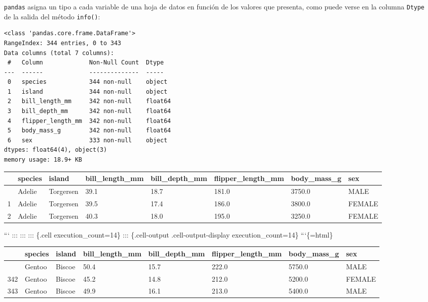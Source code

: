 \documentclass[
  a4paper,
  noprof,
  12pt,
  notoc,
  nosols,
  nobib]{mnye}
\theoremstyle{definition}
\theoremstyle{remark}
\begin{document}
\texttt{pandas} asigna un tipo a cada variable de una hoja de datos en
función de los valores que presenta, como puede verse en la columna
\texttt{Dtype} de la salida del método \texttt{info()}:

\begin{verbatim}
<class 'pandas.core.frame.DataFrame'>
RangeIndex: 344 entries, 0 to 343
Data columns (total 7 columns):
 #   Column             Non-Null Count  Dtype  
---  ------             --------------  -----  
 0   species            344 non-null    object 
 1   island             344 non-null    object 
 2   bill_length_mm     342 non-null    float64
 3   bill_depth_mm      342 non-null    float64
 4   flipper_length_mm  342 non-null    float64
 5   body_mass_g        342 non-null    float64
 6   sex                333 non-null    object 
dtypes: float64(4), object(3)
memory usage: 18.9+ KB
\end{verbatim}

\begin{longtable}[]{@{}llllllll@{}}
\toprule\noalign{}
& species & island & bill\_length\_mm & bill\_depth\_mm &
flipper\_length\_mm & body\_mass\_g & sex \\
\midrule\noalign{}
\endhead
\bottomrule\noalign{}
\endlastfoot
0 & Adelie & Torgersen & 39.1 & 18.7 & 181.0 & 3750.0 & MALE \\
1 & Adelie & Torgersen & 39.5 & 17.4 & 186.0 & 3800.0 & FEMALE \\
2 & Adelie & Torgersen & 40.3 & 18.0 & 195.0 & 3250.0 & FEMALE \\
\end{longtable}

``` ::: ::: ::: \{.cell execution\_count=14\} ::: \{.cell-output
.cell-output-display execution\_count=14\} ```\{=html\}

\begin{longtable}[]{@{}llllllll@{}}
\toprule\noalign{}
& species & island & bill\_length\_mm & bill\_depth\_mm &
flipper\_length\_mm & body\_mass\_g & sex \\
\midrule\noalign{}
\endhead
\bottomrule\noalign{}
\endlastfoot
341 & Gentoo & Biscoe & 50.4 & 15.7 & 222.0 & 5750.0 & MALE \\
342 & Gentoo & Biscoe & 45.2 & 14.8 & 212.0 & 5200.0 & FEMALE \\
343 & Gentoo & Biscoe & 49.9 & 16.1 & 213.0 & 5400.0 & MALE \\
\end{longtable}

\end{document}
